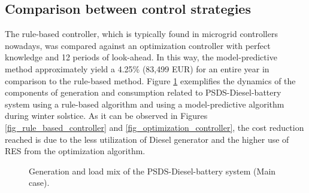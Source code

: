 \documentclass{ECOS_2019}
\begin{document}
\subsection{Comparison between control strategies}
The rule-based controller, which is typically found in microgrid controllers nowadays, was compared against an optimization controller with perfect knowledge and 12 periods of look-ahead. In this way, the model-predictive method approximately yield a 4.25\% (83,499 EUR) for an entire year in comparison to the rule-based method. Figure \ref{fig_controllers} exemplifies the dynamics of the components of generation and consumption related to PSDS-Diesel-battery system using a rule-based algorithm and using a model-predictive algorithm during winter solstice. As it can be observed in Figures \ref{fig_rule_based_controller} and \ref{fig_optimization_controller}, the cost reduction reached is due to the less utilization of Diesel generator and the higher use of RES from the optimization algorithm.
\begin{figure}[h!]
    \centering
    \hfill
    \caption{Generation and load mix of the PSDS-Diesel-battery system (Main case).}
    \label{fig_controllers}
\end{figure}
\end{document}
